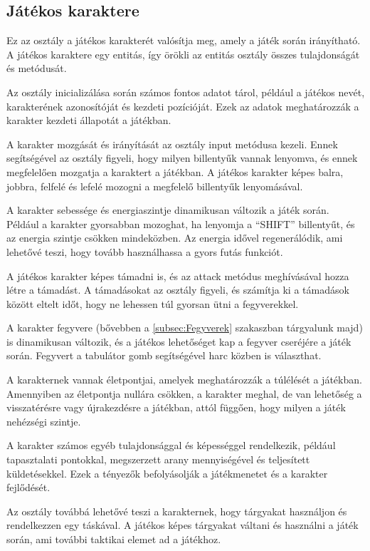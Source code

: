                     
\subsection{Játékos karaktere}
 Ez az osztály a játékos karakterét valósítja meg, amely a játék során irányítható. A játékos karaktere egy entitás, így örökli az entitás osztály összes tulajdonságát és metódusát.

Az osztály inicializálása során számos fontos adatot tárol, például a játékos nevét, karakterének azonosítóját és kezdeti pozícióját. Ezek az adatok meghatározzák a karakter kezdeti állapotát a játékban.

A karakter mozgását és irányítását az osztály input metódusa kezeli. Ennek segítségével az osztály figyeli, hogy milyen billentyűk vannak lenyomva, és ennek megfelelően mozgatja a karaktert a játékban. A játékos karakter képes balra, jobbra, felfelé és lefelé mozogni a megfelelő billentyűk lenyomásával.

A karakter sebessége és energiaszintje dinamikusan változik a játék során. Például a karakter gyorsabban mozoghat, ha lenyomja a ``SHIFT'' billentyűt, és az energia szintje csökken mindeközben. Az energia idővel regenerálódik, ami lehetővé teszi, hogy tovább használhassa a gyors futás funkciót.

A játékos karakter képes támadni is, és az attack metódus meghívásával hozza létre a támadást. A támadásokat az osztály figyeli, és számítja ki a támadások között eltelt időt, hogy ne lehessen túl gyorsan ütni a fegyverekkel.

A karakter fegyvere (bővebben a \ref{subsec:Fegyverek} szakaszban tárgyalunk majd) is dinamikusan változik, és a játékos lehetőséget kap a fegyver cseréjére a játék során. Fegyvert a tabulátor gomb segítségével harc közben is választhat.

A karakternek vannak életpontjai, amelyek meghatározzák a túlélését a játékban. Amennyiben az életpontja nullára csökken, a karakter meghal, de van lehetőség a visszatérésre vagy újrakezdésre a játékban, attól függően, hogy milyen a játék nehézségi szintje.

A karakter számos egyéb tulajdonsággal és képességgel rendelkezik, például tapasztalati pontokkal, megszerzett arany mennyiségével és teljesített küldetésekkel. Ezek a tényezők befolyásolják a játékmenetet és a karakter fejlődését.

Az osztály továbbá lehetővé teszi a karakternek, hogy tárgyakat használjon és rendelkezzen egy táskával. A játékos képes tárgyakat váltani és használni a játék során, ami további taktikai elemet ad a játékhoz.

